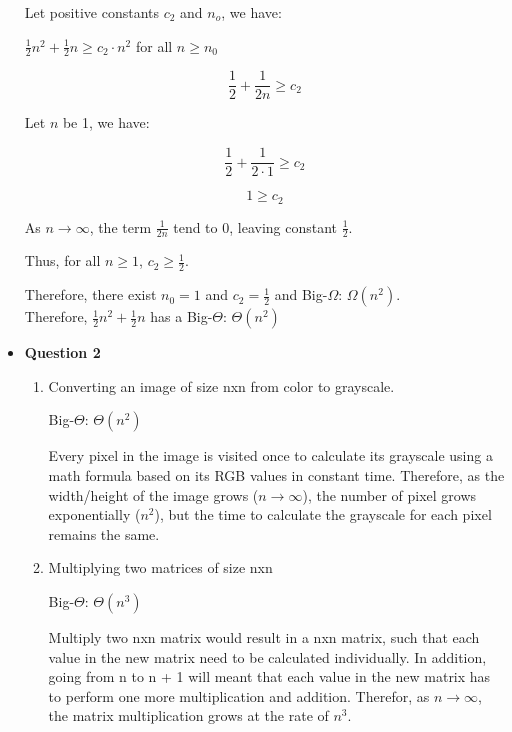 \documentclass{article}
\begin{document}
\begin{itemize}
        Let positive constants $c_2$ and $n_o$, we have:

        \begin{center}
            $\frac{1}{2} n^2 + \frac{1}{2} n \ge c_2\cdot n^2$ for all $n \ge n_0$
        \end{center}

        $$\frac{1}{2} + \frac{1}{2n} \ge c_2$$

        Let $n$ be 1, we have:

        $$\frac{1}{2} + \frac{1}{2 \cdot 1} \ge c_2$$

        $$1 \ge c_2$$

        As $n \to \infty$, the term $\frac{1}{2n}$ tend to $0$, leaving constant $\frac{1}{2}$.

        Thus, for all $n \ge 1$, $c_2 \ge \frac{1}{2}$.

        Therefore, there exist $n_0 = 1$ and $c_2 = \frac{1}{2}$ and Big-$\Omega$: $\Omega(n^2)$.\\

        Therefore, $\frac{1}{2} n^2 + \frac{1}{2} n$ has a Big-$\Theta$: $\Theta(n^2)$\\

    \item\textbf{ Question 2}
    \begin{enumerate}
        \item Converting an image of size nxn from color to grayscale.

        Big-$\Theta$: $\Theta(n^2)$

        Every pixel in the image is visited once to calculate its grayscale using a math formula based on its RGB values in constant time. Therefore, as the width/height of the image grows ($n \to \infty$), the number of pixel grows exponentially ($n^2$), but the time to calculate the grayscale for each pixel remains the same.\\

        \item Multiplying two matrices of size nxn

        Big-$\Theta$: $\Theta(n^3)$

        Multiply two nxn matrix would result in a nxn matrix, such that each value in the new matrix need to be calculated individually. In addition, going from n to n + 1 will meant that each value in the new matrix has to perform one more multiplication and addition. Therefor, as $n \to \infty$, the matrix multiplication grows at the rate of $n^3$.\\


\end{enumerate}
\end{itemize}
\end{document}

